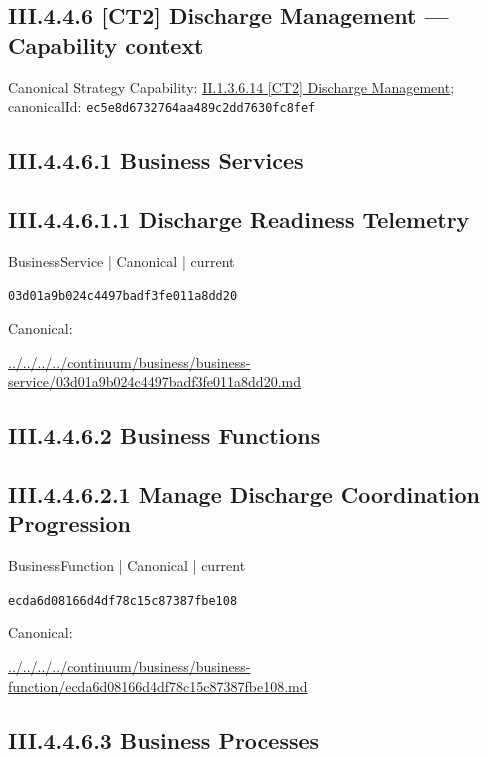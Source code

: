 \documentclass[10pt,a4paper]{article}
\begin{document}
\subsection*{III.4.4.6 [CT2] Discharge Management — Capability context}
Canonical Strategy Capability: \hyperref[element-ec5e8d6732764aa489c2dd7630fc8fef]{II.1.3.6.14 [CT2] Discharge Management}; canonicalId: \texttt{ec5e8d6732764aa489c2dd7630fc8fef}\par
\subsection*{III.4.4.6.1 Business Services}
\subsection*{III.4.4.6.1.1 Discharge Readiness Telemetry}
\label{element-03d01a9b024c4497badf3fe011a8dd20}
{\small BusinessService | Canonical | current}\par
\texttt{03d01a9b024c4497badf3fe011a8dd20}\par
Canonical: \par
{\footnotesize\url{../../../../continuum/business/business-service/03d01a9b024c4497badf3fe011a8dd20.md}}\par
\subsection*{III.4.4.6.2 Business Functions}
\subsection*{III.4.4.6.2.1 Manage Discharge Coordination Progression}
\label{element-ecda6d08166d4df78c15c87387fbe108}
{\small BusinessFunction | Canonical | current}\par
\texttt{ecda6d08166d4df78c15c87387fbe108}\par
Canonical: \par
{\footnotesize\url{../../../../continuum/business/business-function/ecda6d08166d4df78c15c87387fbe108.md}}\par
\subsection*{III.4.4.6.3 Business Processes}
\end{document}
